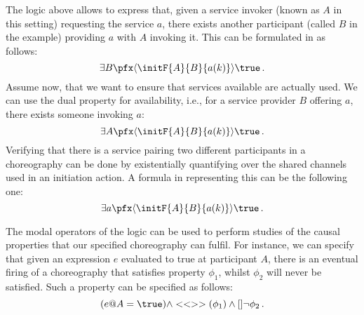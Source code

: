 \begin{example}
  The logic above allows to express that, given a service invoker
  (known as $A$ in this setting) requesting the service $a$, there
  exists another participant (called $B$ in the example) providing $a$
  with $A$ invoking it.  This can be formulated in \GL as follows:
  \begin{equation*}
    \exists B \pfx \langle \initF{A}{B}{a(k)}\rangle \true \, .
  \end{equation*}
  Assume now, that we want to ensure that services available are
  actually used. We can use the dual property for availability, i.e.,
  for a service provider $B$ offering $a$, there exists someone
  invoking $a$:
  \begin{equation*}
    \exists A \pfx \langle \initF{A}{B}{a(k)}\rangle \true \, .
  \end{equation*}
  Verifying that there is a service pairing two different participants
  in a choreography can be done by existentially quantifying over the
  shared channels used in an initiation action. A formula in \GL
  representing this can be the following one:
  \begin{equation*}
    \exists a \pfx \langle \initF{A}{B}{a(k)} \rangle \true \, .
  \end{equation*}
\end{example}
\begin{example}
  The modal operators of the logic can be used to perform studies of
  the causal properties that our specified choreography can fulfil.
  For instance, we can specify that given an expression $e$ evaluated
  to true at participant $A$, there is an eventual firing of a
  choreography that satisfies property $\phi_1$, whilst $\phi_2$ will
  never be satisfied.  Such a property can be specified as follows:
  \begin{equation*}
    (e@A = \true) \land <<>> (\phi_1) \land [] \lnot \phi_2 \, .
  \end{equation*}
\end{example}
